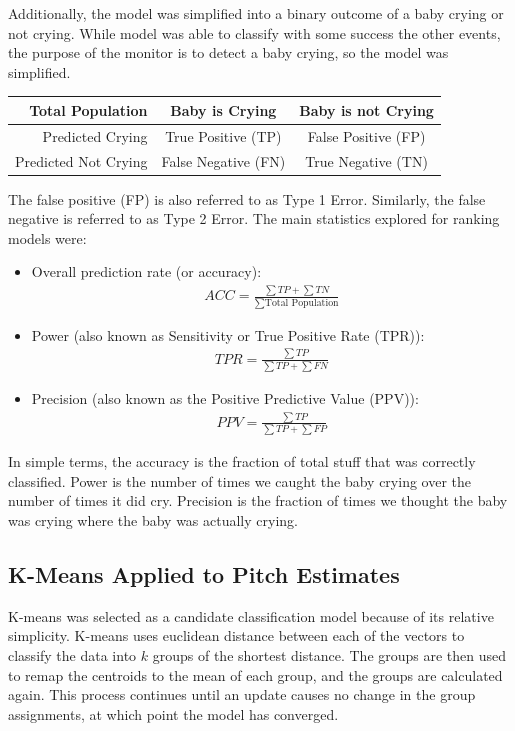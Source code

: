 \documentclass[paper=a4, fontsize=11pt]{scrartcl}
\numberwithin{equation}{section}
\numberwithin{figure}{section}
\numberwithin{table}{section}
\begin{document}
Additionally, the model was simplified into a binary outcome of a baby crying or not crying. While model was able to classify with some success the other events, the purpose of the monitor is to detect a baby crying, so the model was simplified.

\begin{center}
\begin{tabular}{ r | c | c |}
Total Population & Baby is Crying & Baby is not Crying \\\hline
Predicted Crying & \cellcolor{green!25}True Positive (TP) & \cellcolor{red!25}False Positive (FP) \\\hline
Predicted Not Crying & \cellcolor{red!25}False Negative (FN) & \cellcolor{green!25}True Negative (TN)\\\hline
\end{tabular}
\end{center}

The false positive (FP) is also referred to as Type 1 Error. Similarly, the false negative is referred to as Type 2 Error. The main statistics explored for ranking models were:\\
\begin{itemize}
\item Overall prediction rate (or accuracy):
\begin{align*}
ACC = \frac{\sum TP + \sum TN}{\sum \text{Total Population}}
\end{align*}
\item Power (also known as Sensitivity or True Positive Rate (TPR)):
\begin{align*}
TPR = \frac{\sum TP}{\sum TP + \sum FN}
\end{align*}
\item Precision (also known as the Positive Predictive Value (PPV)):
\begin{align*}
PPV = \frac{\sum TP}{\sum TP + \sum FP}
\end{align*}
\end{itemize}

In simple terms, the accuracy is the fraction of total stuff that was correctly classified. Power is the number of times we caught the baby crying over the number of times it did cry. Precision is the fraction of times we thought the baby was crying where the baby was actually crying.

\subsection{K-Means Applied to Pitch Estimates}\label{k-means}
K-means was selected as a candidate classification model because of its relative simplicity. K-means uses euclidean distance between each of the vectors to classify the data into $k$ groups of the shortest distance. The groups are then used to remap the centroids to the mean of each group, and the groups are calculated again. This process continues until an update causes no change in the group assignments, at which point the model has converged.
\end{document}
